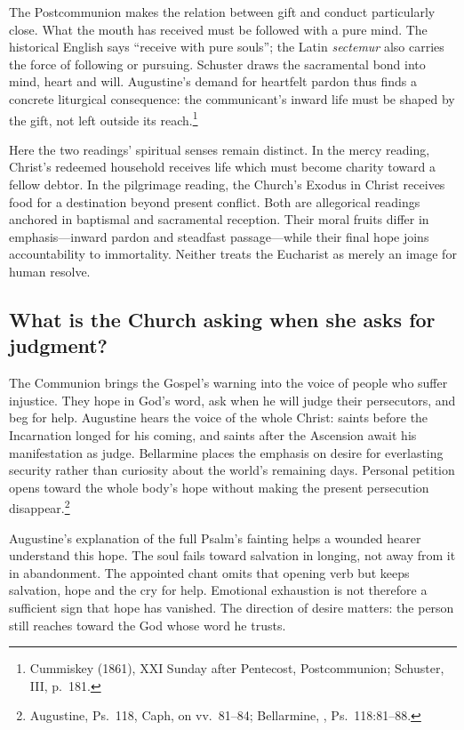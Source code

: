 The Postcommunion makes the relation between gift and conduct particularly close. What the mouth has received must be followed with a pure mind. The historical English says ``receive with pure souls''; the Latin \textit{sectemur} also carries the force of following or pursuing. Schuster draws the sacramental bond into mind, heart and will. Augustine's demand for heartfelt pardon thus finds a concrete liturgical consequence: the communicant's inward life must be shaped by the gift, not left outside its reach.\footnote{Cummiskey (1861), XXI Sunday after Pentecost, Postcommunion; Schuster, III, p.~181.}

Here the two readings' spiritual senses remain distinct. In the mercy reading, Christ's redeemed household receives life which must become charity toward a fellow debtor. In the pilgrimage reading, the Church's Exodus in Christ receives food for a destination beyond present conflict. Both are allegorical readings anchored in baptismal and sacramental reception. Their moral fruits differ in emphasis---inward pardon and steadfast passage---while their final hope joins accountability to immortality. Neither treats the Eucharist as merely an image for human resolve.

\subsection{What is the Church asking when she asks for judgment?}
The Communion brings the Gospel's warning into the voice of people who suffer injustice. They hope in God's word, ask when he will judge their persecutors, and beg for help. Augustine hears the voice of the whole Christ: saints before the Incarnation longed for his coming, and saints after the Ascension await his manifestation as judge. Bellarmine places the emphasis on desire for everlasting security rather than curiosity about the world's remaining days. Personal petition opens toward the whole body's hope without making the present persecution disappear.\footnote{Augustine, Ps.~118, Caph, on vv.~81--84; Bellarmine, , Ps.~118:81--88.}

Augustine's explanation of the full Psalm's fainting helps a wounded hearer understand this hope. The soul fails toward salvation in longing, not away from it in abandonment. The appointed chant omits that opening verb but keeps salvation, hope and the cry for help. Emotional exhaustion is not therefore a sufficient sign that hope has vanished. The direction of desire matters: the person still reaches toward the God whose word he trusts.

